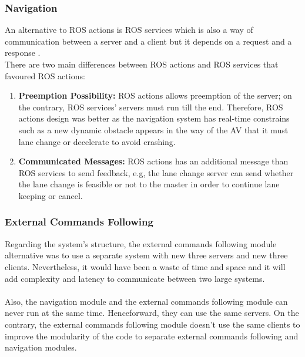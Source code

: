 \subsubsection{Navigation}
\label{des_nav}
An alternative to ROS actions is ROS services which is also a way of communication between a server and a client but it depends on a request and a response \cite{ROSBookMorgan}. \\ 
There are two main differences between ROS actions and ROS services that favoured ROS actions:
\\
\begin{enumerate}
    \item \textbf{Preemption Possibility:}
    ROS actions allows preemption of the server; on the contrary, ROS services' servers must run till the end. Therefore, ROS actions design was better as the navigation system has real-time constrains such as a new dynamic obstacle appears in the way of the AV that it must lane change or decelerate to avoid crashing. 
    \item \textbf{Communicated Messages:}
    ROS actions has an additional message than ROS services to send feedback, e.g, the lane change server can send whether the lane change is feasible or not to the master in order to continue lane keeping or cancel.
\end{enumerate}

\subsubsection{External Commands Following}
\label{des_ext_cmds}
Regarding the system's structure, the external commands following module alternative was to use a separate system with new three servers and new three clients. Nevertheless, it would have been a waste of time and space and it will add complexity and latency to communicate between two large systems. 
\\ \\ 
Also, the navigation module and the external commands following module can never run at the same time. Henceforward, they can use the same servers. On the contrary, the external commands following module doesn't use the same clients to improve the modularity of the code to separate external commands following and navigation modules. 
